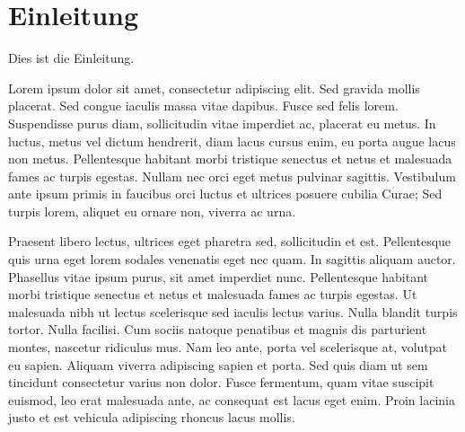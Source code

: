 \chapter{Einleitung}

Dies ist die Einleitung.

Lorem ipsum dolor sit amet, consectetur adipiscing elit. Sed gravida mollis placerat. Sed congue iaculis massa vitae dapibus. Fusce sed felis lorem. Suspendisse purus diam, sollicitudin vitae imperdiet ac, placerat eu metus. In luctus, metus vel dictum hendrerit, diam lacus cursus enim, eu porta augue lacus non metus. Pellentesque habitant morbi tristique senectus et netus et malesuada fames ac turpis egestas. Nullam nec orci eget metus pulvinar sagittis. Vestibulum ante ipsum primis in faucibus orci luctus et ultrices posuere cubilia Curae; Sed turpis lorem, aliquet eu ornare non, viverra ac urna.

Praesent libero lectus, ultrices eget pharetra sed, sollicitudin et est. Pellentesque quis urna eget lorem sodales venenatis eget nec quam. In sagittis aliquam auctor. Phasellus vitae ipsum purus, sit amet imperdiet nunc. Pellentesque habitant morbi tristique senectus et netus et malesuada fames ac turpis egestas. Ut malesuada nibh ut lectus scelerisque sed iaculis lectus varius. Nulla blandit turpis tortor. Nulla facilisi. Cum sociis natoque penatibus et magnis dis parturient montes, nascetur ridiculus mus. Nam leo ante, porta vel scelerisque at, volutpat eu sapien. Aliquam viverra adipiscing sapien et porta. Sed quis diam ut sem tincidunt consectetur varius non dolor. Fusce fermentum, quam vitae suscipit euismod, leo erat malesuada ante, ac consequat est lacus eget enim. Proin lacinia justo et est vehicula adipiscing rhoncus lacus mollis.	